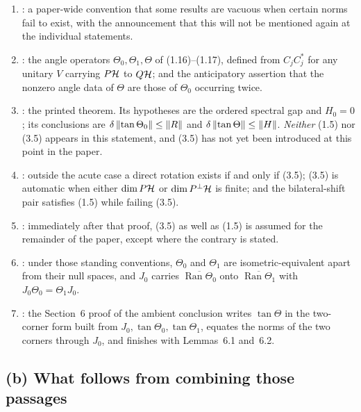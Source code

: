 \begin{enumerate}[leftmargin=2em]
\item {}: a paper-wide convention that some results are vacuous when certain norms fail to exist, with the announcement that this will not be mentioned again at the individual statements.
\item {}: the angle operators $\Theta_0,\Theta_1,\Theta$ of (1.16)--(1.17), defined from $C_jC_j^*$ for any unitary $V$ carrying $P\mathcal{H}$ to $Q\mathcal{H}$; and the anticipatory assertion that the nonzero angle data of $\Theta$ are those of $\Theta_0$ occurring twice.
\item {}: the printed theorem.  Its hypotheses are the ordered spectral gap and $H_0=0$; its conclusions are $\delta\left\lVert \tan\Theta_0\right\rVert\le\left\lVert R\right\rVert$ and $\delta\left\lVert \tan\Theta\right\rVert\le\left\lVert H\right\rVert$.  \emph{Neither} (1.5) nor (3.5) appears in this statement, and (3.5) has not yet been introduced at this point in the paper.
\item {}: outside the acute case a direct rotation exists if and only if (3.5); (3.5) is automatic when either $\dim P\mathcal{H}$ or $\dim P^\perp\mathcal{H}$ is finite; and the bilateral-shift pair satisfies (1.5) while failing (3.5).
\item {}: immediately after that proof, (3.5) as well as (1.5) is assumed for the remainder of the paper, except where the contrary is stated.
\item {}: under those standing conventions, $\Theta_0$ and $\Theta_1$ are isometric-equivalent apart from their null spaces, and $J_0$ carries $\overline{\operatorname{Ran}\Theta_0}$ onto $\overline{\operatorname{Ran}\Theta_1}$ with $J_0\Theta_0=\Theta_1J_0$.
\item {}: the Section~6 proof of the ambient conclusion writes $\tan\Theta$ in the two-corner form built from $J_0,\tan\Theta_0,\tan\Theta_1$, equates the norms of the two corners through $J_0$, and finishes with Lemmas~6.1 and~6.2.
\end{enumerate}

\subsection*{(b) What follows from combining those passages}


